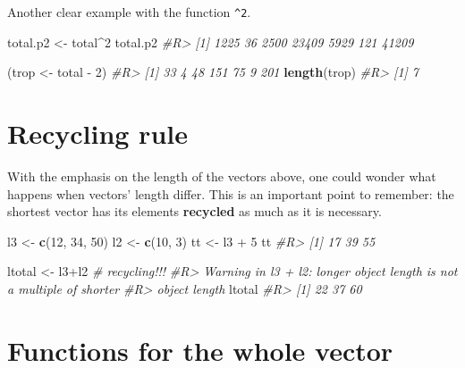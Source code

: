 \documentclass[]{book}
\newenvironment{Shaded}{}{}
\newcommand{\CommentTok}[1]{\textcolor[rgb]{0.38,0.63,0.69}{\textit{#1}}}
\newcommand{\DecValTok}[1]{\textcolor[rgb]{0.25,0.63,0.44}{#1}}
\newcommand{\KeywordTok}[1]{\textcolor[rgb]{0.00,0.44,0.13}{\textbf{#1}}}
\newcommand{\NormalTok}[1]{#1}
\newcommand{\OperatorTok}[1]{\textcolor[rgb]{0.40,0.40,0.40}{#1}}
\newcommand{\StringTok}[1]{\textcolor[rgb]{0.25,0.44,0.63}{#1}}
\theoremstyle{definition}
\theoremstyle{definition}
\theoremstyle{definition}
\theoremstyle{remark}
\begin{document}
Another clear example with the function \texttt{\^{}2}.

\begin{Shaded}
\begin{Highlighting}[]
\NormalTok{total.p2 <-}\StringTok{ }\NormalTok{total}\OperatorTok{^}\DecValTok{2}
\NormalTok{total.p2}
\CommentTok{#R> [1]  1225    36  2500 23409  5929   121 41209}

\NormalTok{(trop <-}\StringTok{ }\NormalTok{total }\OperatorTok{-}\StringTok{ }\DecValTok{2}\NormalTok{)}
\CommentTok{#R> [1]  33   4  48 151  75   9 201}
\KeywordTok{length}\NormalTok{(trop)}
\CommentTok{#R> [1] 7}
\end{Highlighting}
\end{Shaded}

\hypertarget{recycling-rule}{%
\section{Recycling rule}\label{recycling-rule}}

With the emphasis on the length of the vectors above, one could wonder
what happens when vectors' length differ. This is an important point to
remember: the shortest vector has its elements \textbf{recycled} as much
as it is necessary.

\begin{Shaded}
\begin{Highlighting}[]
\NormalTok{l3 <-}\StringTok{ }\KeywordTok{c}\NormalTok{(}\DecValTok{12}\NormalTok{, }\DecValTok{34}\NormalTok{, }\DecValTok{50}\NormalTok{)}
\NormalTok{l2 <-}\StringTok{ }\KeywordTok{c}\NormalTok{(}\DecValTok{10}\NormalTok{, }\DecValTok{3}\NormalTok{)}
\NormalTok{tt <-}\StringTok{ }\NormalTok{l3 }\OperatorTok{+}\StringTok{ }\DecValTok{5}
\NormalTok{tt}
\CommentTok{#R> [1] 17 39 55}

\NormalTok{ltotal <-}\StringTok{ }\NormalTok{l3}\OperatorTok{+}\NormalTok{l2 }\CommentTok{# recycling!!!}
\CommentTok{#R> Warning in l3 + l2: longer object length is not a multiple of shorter}
\CommentTok{#R> object length}
\NormalTok{ltotal}
\CommentTok{#R> [1] 22 37 60}
\end{Highlighting}
\end{Shaded}

\hypertarget{functions-for-the-whole-vector}{%
\section{Functions for the whole
vector}\label{functions-for-the-whole-vector}}
\end{document}
